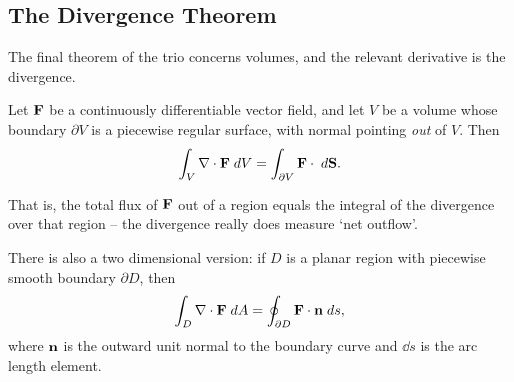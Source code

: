 \documentclass[a4paper]{scrartcl}
\begin{document}
\subsection{The Divergence Theorem}

The final theorem of the trio concerns volumes, and the relevant derivative is the divergence.

\begin{theorem}
	Let $\mathbf{F}$ be a continuously differentiable vector field, and let $V$ be a volume whose boundary $\partial V$ is a piecewise regular surface, with normal pointing \emph{out} of $V$. Then
	$$
	\int_V \nabla \cdot \mathbf{F} \; d V = \int_{\partial V} \mathbf{F} \cdot \; d \mathbf{S}.
	$$
\end{theorem}

That is, the total flux of $\mathbf{F}$ out of a region equals the integral of the divergence over that region -- the divergence really does measure `net outflow'.

\begin{center}
\end{center}

There is also a two dimensional version: if $D$ is a planar region with piecewise smooth boundary $\partial D$, then
$$
\int_D \nabla \cdot \mathbf{F} \; d A = \oint_{\partial D} \mathbf{F} \cdot \mathbf{n} \; d s,
$$
where $\mathbf{n}$ is the outward unit normal to the boundary curve and $\dd s$ is the arc length element.
\end{document}
